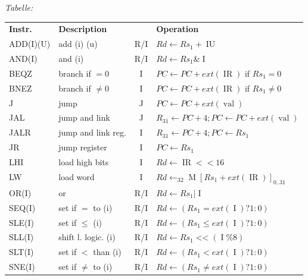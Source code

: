\documentclass[8pt,a4paper]{article}
\newcommand{\imm}{\operatorname{IR}}
\newcommand{\val}{\operatorname{val}}
\newcommand{\mem}{\operatorname{M}}
\newcommand{\ls}{\operatorname{<<}}
\newcommand{\iu}{\operatorname{IU}}
\newcommand{\imme}{\operatorname{I}}
\begin{document}
\begin{multicols}{2}
\emph{Tabelle:}                                                                                          \\
\begin{tabular}{llcl}
\textbf{Instr.} & \textbf{Description} &     & \textbf{Operation}                                        \\
ADD(I)(U)       & add	(i) (u)        & R/I & $Rd \leftarrow Rs_1 + \iu$                                \\	
AND(I)          & and (i)    	       & R/I & $Rd \leftarrow Rs_1 \& \imme$                             \\
BEQZ            & branch if $=0$       & I   & $PC \leftarrow PC + ext(\imm)$ if $Rs_1 = 0$              \\
BNEZ            & branch if $\neq 0$   & I   & $PC \leftarrow PC + ext(\imm)$ if $Rs_1 \neq 0$           \\
J               & jump                 & J   & $PC \leftarrow PC + ext(\val)$                            \\
JAL             & jump and link        & J   & $R_{31} \leftarrow PC + 4 ; PC \leftarrow PC + ext(\val)$ \\
JALR            & jump and link reg.   & I   & $R_{31} \leftarrow PC + 4 ; PC \leftarrow Rs_1$           \\
JR              & jump register        & I   & $PC \leftarrow Rs_1$                                      \\	
LHI             & load high bits       & I   & $Rd \leftarrow \imm <<16$                                 \\
LW              & load word            & I   & $Rd\leftarrow_{32}\mem[Rs_1 + ext(\imm)]_{0..31}$         \\
OR(I)           & or                   & R/I & $Rd \leftarrow Rs_1 | \imme$                              \\
SEQ(I)          & set if $=$ to (i)    & R/I & $Rd \leftarrow (Rs_1 = ext(\imme) ? 1 : 0)$               \\
SLE(I)          & set if $\leq$ (i)    & R/I & $Rd \leftarrow (Rs_1 \leq ext(\imme) ? 1 : 0)$            \\
SLL(I)          & shift l. logic. (i)  & R/I & $Rd \leftarrow Rs_1 \ls (\imme\% 8)$                      \\
SLT(I)          & set if $<$ than (i)  & R/I & $Rd \leftarrow (Rs_1 < ext(\imme) ? 1 : 0)$               \\
SNE(I)          & set if $\neq$ to (i) & R/I & $Rd \leftarrow (Rs_1 \neq ext(\imme) ? 1 : 0)$            \\

\end{tabular}
\end{multicols}
\end{document}
